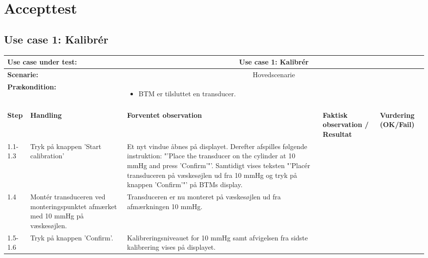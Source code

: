 \chapter{Accepttest}
\section{Use case 1: Kalibrér}
\begin{tabular}{|p{1cm}|p{3cm}|p{4cm}|p{4cm}|p{2cm}|}
\hline
\multicolumn{2}{|p{3cm}|}{\textbf{Use case under test:}} & \multicolumn{3}{c|}{Use case 1: Kalibrér} \\\hline

\multicolumn{2}{|p{3cm}|}{\textbf{Scenarie:}} & \multicolumn{3}{c|}{Hovedscenarie} \\\hline

\multicolumn{2}{|p{3cm}|}{\textbf{Prækondition:}}  & \multicolumn{3}{l|}{\parbox{0.6\textwidth}{
\begin{itemize}[label=$\circ$]
\item BTM er tilsluttet en transducer. 
\end{itemize} }}\\\hline

\multicolumn{5}{|c|}{} \\\hline

\textbf{Step} & \textbf{Handling} & \textbf{Forventet observation} & \textbf{Faktisk observation / Resultat} & \textbf{Vurdering (OK/Fail)}\\\hline

1.1-1.3 & Tryk på knappen 'Start calibration' & Et nyt vindue åbnes på displayet. Derefter afspilles følgende instruktion: "'Place the transducer on the cylinder at 10 mmHg and press 'Confirm'"'. Samtidigt vises teksten "'Placér transduceren på væskesøjlen ud fra 10 mmHg og tryk på knappen 'Confirm'"' på BTMs display. & & \\\hline

1.4 & Montér transduceren ved monteringspunktet afmærket med 10 mmHg på væskesøjlen. & Transduceren er nu monteret på væskesøjlen ud fra afmærkningen 10 mmHg. & &  \\\hline

1.5-1.6 & Tryk på knappen 'Confirm'. & Kalibreringsniveauet for 10 mmHg samt afvigelsen fra sidste kalibrering vises på displayet. &  & \\\hline
\end{tabular}


